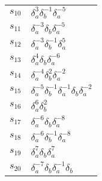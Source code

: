 \documentclass{article}
\begin{document}
\begin{center}
\begin{tabular}{ll}
$s_{10}$ & $\delta_a^{3}\delta_b^{-1}\delta_a^{-5}$ \\
$s_{11}$ & $\delta_a^{-3}\delta_b^{}\delta_a^{-5}$ \\
$s_{12}$ & $\delta_a^{-3}\delta_b^{-1}\delta_a^{5}$ \\
$s_{13}$ & $\delta_a^{4}\delta_b^{}\delta_a^{-6}$ \\
$s_{14}$ & $\delta_a^{-4}\delta_b^{2}\delta_a^{-2}$ \\
$s_{15}$ & $\delta_a^{-5}\delta_b^{-1}\delta_a^{-1}\delta_b^{}\delta_a^{-2}$ \\
$s_{16}$ & $\delta_a^{6}\delta_b^{2}$ \\
$s_{17}$ & $\delta_a^{-6}\delta_b^{}\delta_a^{-8}$ \\
$s_{18}$ & $\delta_a^{-6}\delta_b^{-1}\delta_a^{-8}$ \\
$s_{19}$ & $\delta_a^{7}\delta_b^{}\delta_a^{7}$ \\
$s_{20}$ & $\delta_a^{-7}\delta_b^{}\delta_a^{-1}\delta_b^{}$ \\
\bottomrule
\end{tabular}
\end{center}

\thispagestyle{empty}
\end{document}
